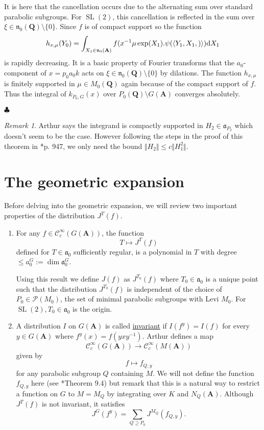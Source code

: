 \documentclass[11pt]{amsart}
\renewcommand\qedsymbol{$\clubsuit$}
\def\A{\mathbf A}
\def\Q{\mathbf Q}
\def\CCC{\mathcal C}
\def\PPP{\mathcal P}
\def\aaa{\mathfrak a}
\def\cb#1{{\color{blue}#1}}
\def\d{\text d}
\def\bs{\setminus} 			%
\def\dim{\operatorname{dim}}
\def\norm#1{\Vert #1 \Vert} %
\def\nnn{\mathfrak n}
\def\sl{\operatorname{SL}}
\def\sprod#1#2{\left\langle #1 , #2 \right\rangle}  %
\theoremstyle{remark}
\newtheorem{remark}[theorem]{Remark}
\begin{document}
\cb{It is here that the cancellation occurs due to the alternating sum over standard parabolic subgroups. For $\sl(2)$, this cancellation is reflected in the sum over $\xi \in \nnn_0(\Q) \bs \{0\}$. Since $f$ is of compact support so the function
\[ h_{x, \mu}(Y_0) = \int_{X_1 \in \nnn_0(\A)} f(x^{-1} \mu \exp(X_1) . \psi(\sprod{Y_1, X_1})) \d X_1 \]
is rapidly decreasing. It is a basic property of Fourier transforms that the $a_0$-component of $x = p_0 a_0 k$ acts on $\xi \in \nnn_0(\Q) \bs \{0\}$ by dilations. The function $h_{x, \mu}$ is finitely supported in $\mu \in M_0(\Q)$ again because of the compact support of $f$. Thus the integral of $k_{P_0, G}(x)$ over $P_0(\Q)\bs G(\A)$ converges absolutely. 
}

\qedsymbol

\begin{remark}
	Arthur says the integrand is compactly supported in $H_2 \in \aaa_{P_2}$ which doesn't seem to be the case. However following the steps in the proof of this theorem in \cite{duke}*{p. 947}, we only need the bound $\norm{H_2} \leq c \norm{H_1^2}$. 
\end{remark}

\section{The geometric expansion}

Before delving into the geometric expansion, we will review two important properties of the distribution $J^T(f)$. 
\begin{enumerate}
	\item For any $f \in \CCC_c^\infty(G(\A))$, the function
		\[ T \mapsto J^T(f) \]
		defined for $T \in \aaa_0$ sufficiently regular, is a polynomial in $T$ with degree $\leq a_0^G := \dim \aaa_0^G$. 
		
		Using this result we define $J(f)$ as $J^{T_0}(f)$ where $T_0 \in \aaa_0$ is a unique point such that the distribution $J^{T_0}(f)$ is independent of the choice of $P_0 \in \PPP(M_0)$, the set of minimal parabolic subgroups with Levi $M_0$. \cb{For $\sl(2), T_0 \in \aaa_0$ is the origin.}
		
	\item A distribution $I$ on $G(\A)$ is called \underline{invariant} if $I(f^y) = I(f)$ for every $y \in G(\A)$ where $f^y(x) = f(yxy^{-1})$. Arthur defines a map
	\[ \CCC_c^\infty(G(\A)) \to \CCC_c^\infty(M(\A)) \]
	given by
	\[ f \mapsto f_{Q, y} \]
	for any parabolic subgroup $Q$ containing $M$. We will not define the function $f_{Q, y}$ here (see \cite{clay}*{Theorem 9.4}) but remark that this is a natural way to restrict a function on $G$ to $M = M_Q$ by integrating over $K$ and $N_Q(\A)$. Although $J^T(f)$ is not invariant, it satisfies
	\[ J^G(f^y) = \sum_{Q \supseteq P_0} J^{M_Q}(f_{Q, y}). \]
\end{enumerate}
\end{document}
